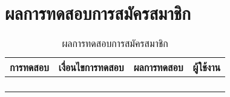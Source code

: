 \section{ผลการทดสอบการสมัครสมาชิก}
\begin{table}[H]
	\caption{ผลการทดสอบการสมัครสมาชิก}
    \centering	
	\label{tab:test2}
    \begin{tabular}{ | p{4cm} | p{4cm} | p{4cm} | p{2cm} | }
    \hline
	\multicolumn{1}{|c|}{การทดสอบ} & \multicolumn{1}{c|}{เงื่อนไขการทดสอบ} & \multicolumn{1}{c|}{ผลการทดสอบ} & \multicolumn{1}{c|}{ผู้ใช้งาน}                             \\ \hline
	\setstretch{1.0}{ทดสอบการสมัครสมาชิก}
	& \setstretch{1.0}{ผู้ใช้งานเข้ามาในหน้าสมัครสมาชิก}
	& \setstretch{1.0}{ระบบแสดงหน้าสมัครสมาชิก} 
	&\setstretch{1.0}{\begin{flushleft}ผู้ใช้งาน\end{flushleft}} \\ \cline{2-3} 
	& \setstretch{1.0}{ผู้ใช้ไม่หรอกข้อมูลชื่อและรหัสผ่าน} 
	& \setstretch{1.0}{ระบบจะแสดงข้อความว่า  ชื่อผู้ใช้หรือรหัสผ่านไม่ถูกต้อง } 
	&\setstretch{1.0}{}\\ \cline{2-3} 
	& \setstretch{1.0}{ผู้ใช้กดปุ่มสมัครสมาชิกโดยกรอกชื่อซ้ำกับชื่อที่มีอยู่ในระบบ}  
	& \setstretch{1.0}{ระบบจะแสดงข้อความว่า  ชื่อผู้ใช้หรือรหัสผ่านไม่ถูกต้อง } 
	&\setstretch{1.0}{}\\ \cline{2-3} 
	& \setstretch{1.0}{ผู้ใช้กดปุ่มสมัครสมาชิกโดยกรอกชื่อไม่ซ้ำกับชื่อที่มีอยู่ในระบบ} 
	& \setstretch{1.0}{มีข้อความแสดงบอกผู้ใช้ว่า  สมัครสมาชิกสำเร็จ } 
	&\setstretch{1.0}{}\\ \cline{2-3} \hline
    \end{tabular}
\end{table}

